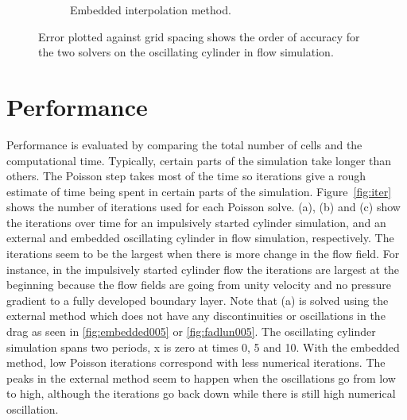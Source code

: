\documentclass[onehalf,11pt]{beavtex}
\begin{document}
\begin{figure}[!htb]
\begin{subfigure}{0.4\textwidth}
		\caption{Embedded interpolation method.}
	\end{subfigure}
	\caption{Error plotted against grid spacing shows the order of accuracy for the two solvers on the oscillating cylinder in flow simulation.}
	\label{fig:oscerror}
\end{figure}

\section{Performance}
Performance is evaluated by comparing the total number of cells and the computational time. 
Typically, certain parts of the simulation take longer than others. 
The Poisson step takes most of the time so iterations give a rough estimate of  time being spent in certain parts of the simulation.
Figure~\ref{fig:iter} shows the number of iterations used for each Poisson solve. 
(a), (b) and (c) show the iterations over time for an impulsively started cylinder simulation, and an external and embedded oscillating cylinder in flow simulation, respectively. 
The iterations seem to be the largest when there is more change in the flow field. 
For instance, in the impulsively started cylinder flow the iterations are  largest at the beginning because the flow fields are going from unity velocity and no pressure gradient to a fully developed boundary layer. 
Note that (a) is solved using the external method which does not have any discontinuities or oscillations in the drag as seen in \ref{fig:embedded005} or \ref{fig:fadlun005}.
The oscillating cylinder simulation spans two periods, x is zero at times 0, 5 and 10. 
With the embedded method, low Poisson iterations correspond with less numerical iterations. 
The peaks in the external method seem to happen when the oscillations go from low to high, although the iterations go back down while there is still high numerical oscillation. 
\end{document}
